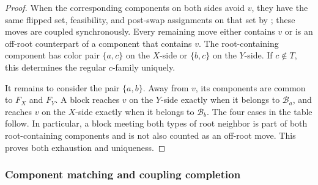 \begin{proof}
When the corresponding components on both sides avoid \(v\), they have
the same flipped set, feasibility, and post-swap assignments on that set
by ; these moves are coupled synchronously.
Every remaining move either contains \(v\) or is an off-root counterpart
of a component that contains \(v\).  The root-containing component has
color pair \(\{a,c\}\) on the \(X\)-side or \(\{b,c\}\) on the
\(Y\)-side.  If \(c\notin T\), this determines the regular \(c\)-family
uniquely.

It remains to consider the pair \(\{a,b\}\).  Away from \(v\), its
components are common to \(F_X\) and \(F_Y\).  A block reaches \(v\) on
the \(Y\)-side exactly when it belongs to \(\mathcal B_a\), and reaches
\(v\) on the \(X\)-side exactly when it belongs to \(\mathcal B_b\).
The four cases in the table follow.  In particular, a block meeting both
types of root neighbor is part of both root-containing components and is
not also counted as an off-root move.  This proves both exhaustion and
uniqueness.
\end{proof}

\subsubsection{Component matching and coupling completion}

